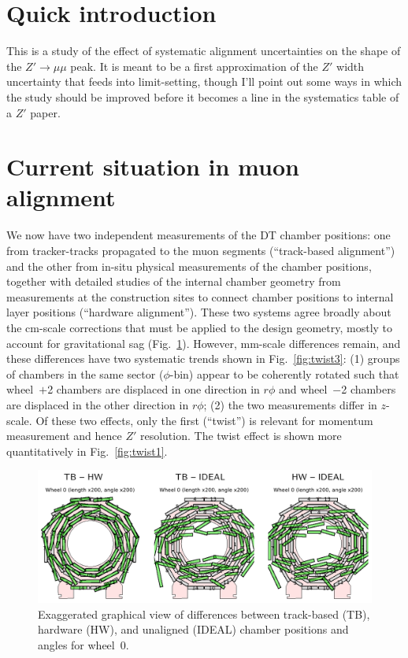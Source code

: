 \documentclass[12pt]{article}
\begin{document}
\section{Quick introduction}

This is a study of the effect of systematic alignment uncertainties on
the shape of the $Z' \to \mu\mu$ peak.  It is meant to be a first
approximation of the $Z'$ width uncertainty that feeds into
limit-setting, though I'll point out some ways in which the study
should be improved before it becomes a line in the systematics table
of a $Z'$ paper.

\section{Current situation in muon alignment}

We now have two independent measurements of the DT chamber positions:
one from tracker-tracks propagated to the muon segments (``track-based
alignment'') and the other from in-situ physical measurements of the
chamber positions, together with detailed studies of the internal
chamber geometry from measurements at the construction sites to
connect chamber positions to internal layer positions (``hardware
alignment'').  These two systems agree broadly about the cm-scale
corrections that must be applied to the design geometry, mostly to
account for gravitational sag (Fig.~\ref{fig:tb-hw_wheel0}).  However,
mm-scale differences remain, and these differences have two systematic
trends shown in Fig.~\ref{fig:twist3}: (1) groups of chambers in the
same sector ($\phi$-bin) appear to be coherently rotated such that
wheel~$+$2 chambers are displaced in one direction in $r\phi$ and
wheel~$-$2 chambers are displaced in the other direction in $r\phi$;
(2) the two measurements differ in $z$-scale.  Of these two effects,
only the first (``twist'') is relevant for momentum measurement and
hence $Z'$ resolution.  The twist effect is shown more quantitatively
in Fig.~\ref{fig:twist1}.

\begin{figure}
\includegraphics[width=\linewidth]{tb-hw_wheel0.png}
\caption{Exaggerated graphical view of differences between
  track-based (TB), hardware (HW), and unaligned (IDEAL) chamber
  positions and angles for wheel~0. \label{fig:tb-hw_wheel0}}
\end{figure}
\end{document}
